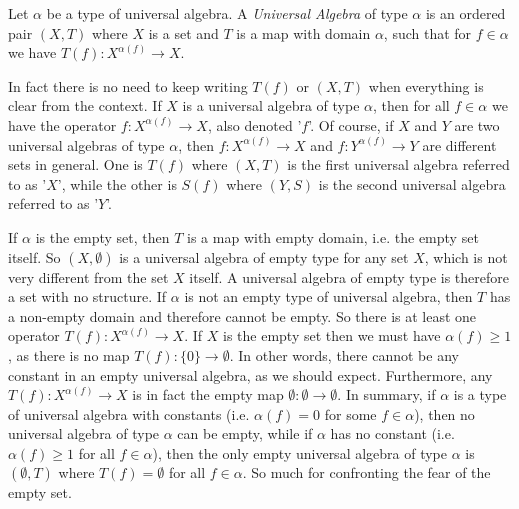 \begin{defin}\label{logic:def:universal:algebra}
Let $\alpha$ be a type of universal algebra. A {\em Universal
Algebra} of type $\alpha$ is an ordered pair $(X,T)$ where $X$ is a
set and $T$ is a map with domain $\alpha$, such that for
$f\in\alpha$ we have $T(f):X^{\alpha(f)}\to X$.
\end{defin}
In fact there is no need to keep writing $T(f)$ or $(X,T)$ when
everything is clear from the context. If $X$ is a universal algebra
of type $\alpha$, then for all $f\in\alpha$ we have the operator
$f:X^{\alpha(f)}\to X$, also denoted '$f$'. Of course, if $X$ and
$Y$ are two universal algebras of type $\alpha$, then
$f:X^{\alpha(f)}\to X$ and $f:Y^{\alpha(f)}\to Y$ are different sets
in general. One is $T(f)$ where $(X,T)$ is the first universal
algebra referred to as '$X$', while the other is $S(f)$ where
$(Y,S)$ is the second universal algebra referred to as '$Y$'.

If $\alpha$ is the empty set, then $T$ is a map with empty domain,
i.e. the empty set itself. So $(X,\emptyset)$ is a universal algebra
of empty type for any set $X$, which is not very different from the
set $X$ itself. A universal algebra of empty type is therefore a set
with no structure. If $\alpha$ is not an empty type of universal
algebra, then $T$ has a non-empty domain and therefore cannot be
empty. So there is at least one operator $T(f):X^{\alpha(f)}\to X$.
If $X$ is the empty set then we must have $\alpha(f)\geq 1$, as
there is no map $T(f):\{0\}\to\emptyset$. In other words, there
cannot be any constant in an empty universal algebra, as we should
expect. Furthermore, any $T(f):X^{\alpha(f)}\to X$ is in fact the
empty map $\emptyset:\emptyset\to\emptyset$. In summary, if $\alpha$
is a type of universal algebra with constants (i.e. $\alpha(f)=0$
for some $f\in\alpha$), then no universal algebra of type $\alpha$
can be empty, while if $\alpha$ has no constant (i.e. $\alpha(f)\geq
1$ for all $f\in\alpha$), then the only empty universal algebra of
type $\alpha$ is $(\emptyset,T)$ where $T(f)=\emptyset$ for all
$f\in\alpha$. So much for confronting the fear of the empty set.
